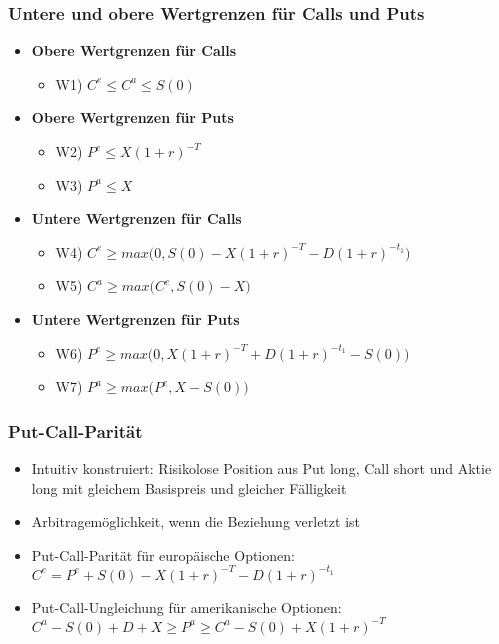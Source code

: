 \subsubsection{Untere und obere Wertgrenzen für Calls und Puts}
\begin{itemize}
	\item \textbf{Obere Wertgrenzen für Calls}
	\begin{itemize}
		\item W1) \(C^e \le C^a \le S(0)\)
	\end{itemize}
	\item \textbf{Obere Wertgrenzen für Puts}
	\begin{itemize}
		\item W2) \(P^e \le X(1+r)^{-T}\)
		\item W3) \(P^a \le X\)
	\end{itemize}
	\item \textbf{Untere Wertgrenzen für Calls}
	\begin{itemize}
		\item W4) \(C^e \ge max\big(0, S(0)-X(1+r)^{-T}-D(1+r)^{-t_1}\big)\)
		\item W5) \(C^a \ge max\big(C^e, S(0)-X\big)\)
	\end{itemize}
	\item \textbf{Untere Wertgrenzen für Puts}
	\begin{itemize}
		\item W6) \(P^e \ge max\big(0, X(1+r)^{-T}+D(1+r)^{-t_1}-S(0)\big)\)
		\item W7) \(P^a \ge max\big(P^e, X-S(0)\big)\)
	\end{itemize}
\end{itemize}

\subsubsection{Put-Call-Parität}
\begin{itemize}
	\item Intuitiv konstruiert: Risikolose Position aus Put long, Call short und Aktie long mit gleichem Basispreis und gleicher Fälligkeit
	\item Arbitragemöglichkeit, wenn die Beziehung verletzt ist
	\item Put-Call-Parität für europäische Optionen: \(C^e = P^e + S(0) - X(1+r)^{-T} - D(1+r)^{-t_1}\)
	\item Put-Call-Ungleichung für amerikanische Optionen: \(C^a - S(0) + D + X \ge P^a \ge C^a - S(0) + X(1+r)^{-T}\)
\end{itemize}


